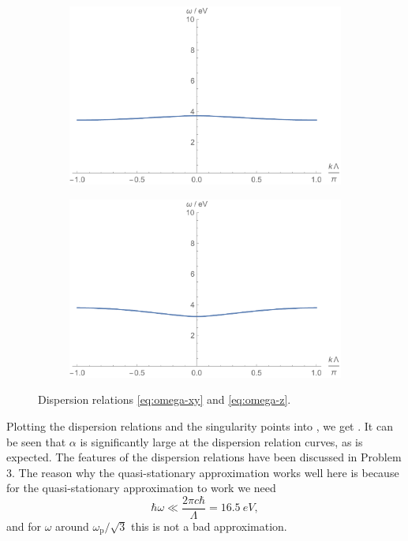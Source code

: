 \documentclass[hyperref, a4paper]{article}
\begin{document}
\begin{figure}
    \centering
    \begin{subfigure}{0.45\textwidth}
        \includegraphics[width=\textwidth]{omegaxy.pdf}
    \end{subfigure}
    \begin{subfigure}{0.45\textwidth}
        \includegraphics[width=\textwidth]{omegaz.pdf}
    \end{subfigure}
    \caption{Dispersion relations \eqref{eq:omega-xy} and \eqref{eq:omega-z}.}
    \label{fig:omega}
\end{figure}

Plotting the dispersion relations and the singularity points into , we get 
. It can be seen that $\alpha$ is significantly large at the dispersion relation curves,
as is expected. The features of the dispersion relations have been discussed in Problem 3. The reason why 
the quasi-stationary approximation works well here is because for the quasi-stationary approximation to work we need 
\[
    \hbar \omega \ll \frac{2 \pi c \hbar}{\Lambda} = \SI{16.5}{eV},
\]
and for $\omega$ around $\omega_\text{p} / \sqrt{3}$ this is not a bad approximation. 
\end{document}
